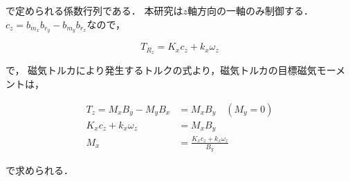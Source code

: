 で定められる係数行列である．
本研究は$z$軸方向の一軸のみ制御する．$c_z = b_{m_x}b_{r_y} - b_{m_y}b_{r_x}$なので，

\begin{equation}
    T_{R_z} = K_x c_z + k_x \omega_z 
\end{equation}

で，
磁気トルカにより発生するトルクの式より，磁気トルカの目標磁気モーメントは，

\begin{equation}
    \begin{aligned}
        T_z = M_x B_y - M_y B_x &= M_x B_y \quad(M_y = 0)\\
         K_x c_z + k_x \omega_z &= M_x B_y\\
                            M_x &= \frac{K_x c_z + k_x \omega_z}{B_y}
    \end{aligned}
\end{equation}

で求められる\cite{cross}．